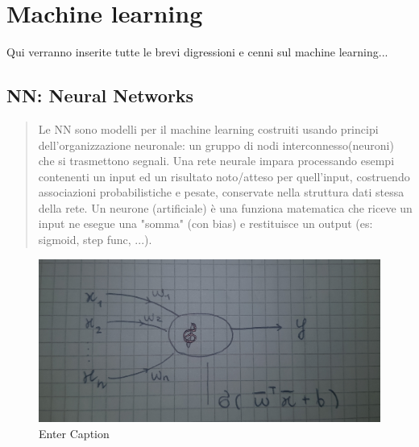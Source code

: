 \chapter{Machine learning}


Qui verranno inserite tutte le brevi digressioni e cenni sul machine learning...



\section{NN: Neural Networks}

\begin{abstract}
Le NN sono modelli per il machine learning costruiti usando principi dell'organizzazione neuronale: un gruppo di nodi interconnesso(neuroni) che si trasmettono segnali.
Una rete neurale impara processando esempi contenenti un input ed un risultato noto/atteso per quell'input, costruendo associazioni probabilistiche e pesate, conservate nella struttura dati stessa  della rete.
Un neurone (artificiale) è una funziona matematica che riceve un input ne esegue una "somma" (con bias) e restituisce un output (es: sigmoid, step func, ...).
\end{abstract}
\begin{figure}
    \centering
    \includegraphics[width=0.5\linewidth]{20231130_172209.jpg}
    \caption{Enter Caption}
    \label{fig:enter-label}
\end{figure}
